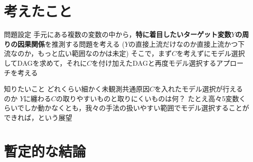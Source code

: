\documentclass[dvipdfmx]{jsarticle}
\newcommand{\red}[1]{\textcolor{red}{#1}}
\begin{document}
\section{考えたこと}
\begin{outline}
\1 問題設定
   \2 手元にある複数の変数の中から，\textbf{特に着目したいターゲット変数$Y$の周りの因果関係}を推測する問題を考える
       \3 ($Y$の直接上流だけなのか直接上流かつ下流なのか，もっと広い範囲なのかは未定)
   \2 そこで，まず$C$を考えずにモデル選択してDAGを求めて，それに$C$を付け加えたDAGと再度モデル選択するアプローチを考える

\vspace{60mm}

\1 知りたいこと
   \2 どれくらい細かく未観測共通原因$C$を入れたモデル選択が行えるのか
      \3 $Y$に纏わる$C$の取りやすいものと取りにくいものは何？
      \3 たとえ高々5変数くらいでしか動かなくとも，我々の手法の扱いやすい範囲でモデル選択することができれば，という展望
\end{outline}


\section{暫定的な結論}

\end{document}
